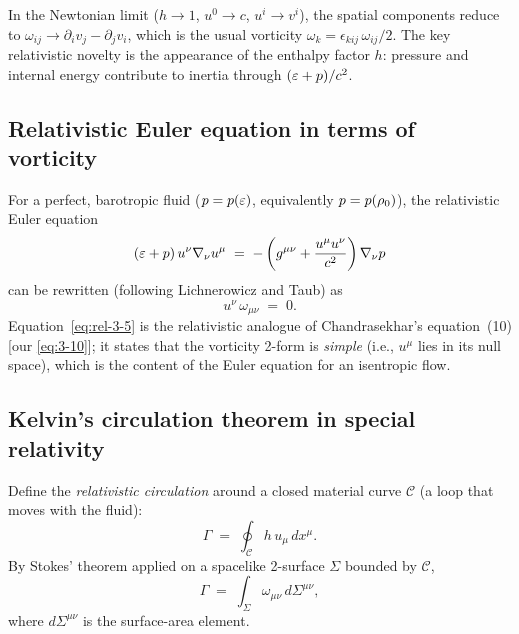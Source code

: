 \begin{relcorrection}
In the Newtonian limit ($h\to 1$, $u^{0}\to c$, $u^{i}\to v^{i}$),
the spatial components reduce to
$\omega_{ij} \to \partial_{i}v_{j} - \partial_{j}v_{i}$,
which is the usual vorticity $\omega_{k} = \epsilon_{kij}\,\omega_{ij}/2$.
The key relativistic novelty is the appearance of the enthalpy factor $h$:
pressure and internal energy contribute to inertia through $(\varepsilon+p)/c^{2}$.
\end{relcorrection}

\subsection{Relativistic Euler equation in terms of vorticity}

For a perfect, barotropic fluid ($p = p(\varepsilon)$, equivalently
$p = p(\rho_0)$), the relativistic Euler equation
\begin{equation}\label{eq:rel-3-4}
  (\varepsilon + p)\,u^{\nu}\nabla_{\nu}u^{\mu}
  \;=\;
  -\left(g^{\mu\nu} + \frac{u^{\mu}u^{\nu}}{c^{2}}\right)\nabla_{\nu}p
\end{equation}
can be rewritten (following Lichnerowicz and Taub) as
\begin{equation}\label{eq:rel-3-5}
  u^{\nu}\,\omega_{\mu\nu} \;=\; 0.
\end{equation}
Equation~\eqref{eq:rel-3-5} is the relativistic analogue of
Chandrasekhar's equation~(10) [our \eqref{eq:3-10}]; it states that
the vorticity 2-form is \emph{simple} (i.e., $u^{\mu}$ lies in its
null space), which is the content of the Euler equation for an
isentropic flow.

\subsection{Kelvin's circulation theorem in special relativity}

Define the \emph{relativistic circulation} around a closed material
curve $\mathcal{C}$ (a loop that moves with the fluid):
\begin{equation}\label{eq:rel-3-6}
  \Gamma
  \;=\;
  \oint_{\mathcal{C}} h\,u_{\mu}\,dx^{\mu}.
\end{equation}
By Stokes' theorem applied on a spacelike 2-surface $\Sigma$ bounded
by $\mathcal{C}$,
\begin{equation}\label{eq:rel-3-7}
  \Gamma
  \;=\;
  \int_{\Sigma} \omega_{\mu\nu}\,d\Sigma^{\mu\nu},
\end{equation}
where $d\Sigma^{\mu\nu}$ is the surface-area element.

